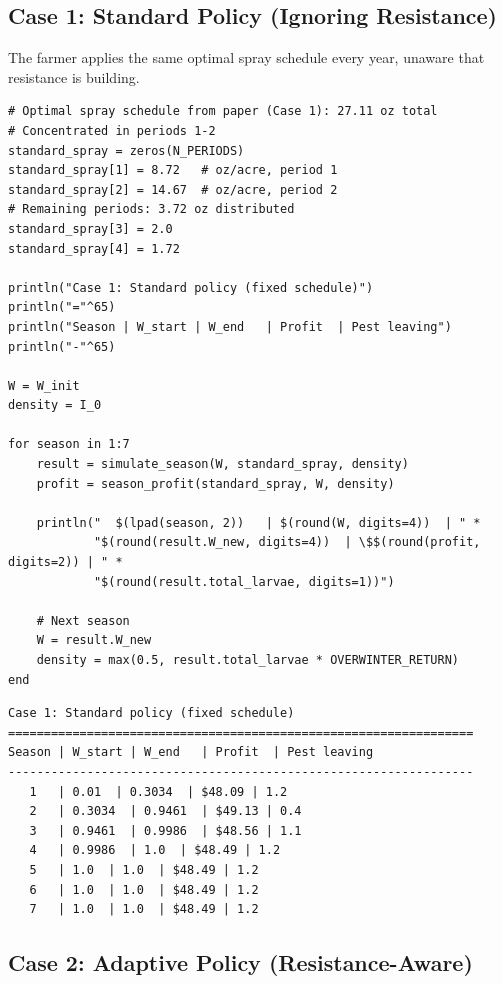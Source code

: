 \subsection{Case 1: Standard Policy (Ignoring Resistance)}



\label{4492513754577106284}{}


The farmer applies the same optimal spray schedule every year, unaware that resistance is building.




\begin{verbatim}
# Optimal spray schedule from paper (Case 1): 27.11 oz total
# Concentrated in periods 1-2
standard_spray = zeros(N_PERIODS)
standard_spray[1] = 8.72   # oz/acre, period 1
standard_spray[2] = 14.67  # oz/acre, period 2
# Remaining periods: 3.72 oz distributed
standard_spray[3] = 2.0
standard_spray[4] = 1.72

println("Case 1: Standard policy (fixed schedule)")
println("="^65)
println("Season | W_start | W_end   | Profit  | Pest leaving")
println("-"^65)

W = W_init
density = I_0

for season in 1:7
    result = simulate_season(W, standard_spray, density)
    profit = season_profit(standard_spray, W, density)

    println("  $(lpad(season, 2))   | $(round(W, digits=4))  | " *
            "$(round(result.W_new, digits=4))  | \$$(round(profit, digits=2)) | " *
            "$(round(result.total_larvae, digits=1))")

    # Next season
    W = result.W_new
    density = max(0.5, result.total_larvae * OVERWINTER_RETURN)
end
\end{verbatim}




\begin{verbatim}
Case 1: Standard policy (fixed schedule)
=================================================================
Season | W_start | W_end   | Profit  | Pest leaving
-----------------------------------------------------------------
   1   | 0.01  | 0.3034  | $48.09 | 1.2
   2   | 0.3034  | 0.9461  | $49.13 | 0.4
   3   | 0.9461  | 0.9986  | $48.56 | 1.1
   4   | 0.9986  | 1.0  | $48.49 | 1.2
   5   | 1.0  | 1.0  | $48.49 | 1.2
   6   | 1.0  | 1.0  | $48.49 | 1.2
   7   | 1.0  | 1.0  | $48.49 | 1.2
\end{verbatim}



\subsection{Case 2: Adaptive Policy (Resistance-Aware)}



